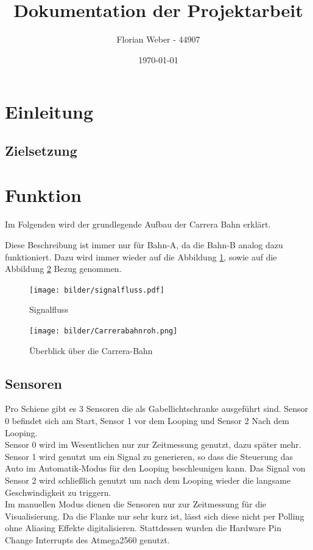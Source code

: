 \documentclass[a4paper, 11pt]{scrartcl}
\title{Dokumentation der Projektarbeit}
\author{Florian Weber - 44907}
\date{\today}
\begin{document}
\maketitle	%
\newpage

\tableofcontents 	%
\listoffigures		%
\newpage

\section{Einleitung}
\subsection{Zielsetzung}
\newpage

\section{Funktion}
	Im Folgenden wird der grundlegende Aufbau der Carrera Bahn erklärt.

	Diese Beschreibung ist immer nur für Bahn-A, da die 
	Bahn-B analog dazu funktioniert. Dazu wird immer wieder auf die Abbildung \ref{img:signalfluss}, sowie auf die \\Abbildung 
	\ref{img:carrerakomplett} Bezug genommen.
	\begin{figure}[h]
		\centering
		\texttt{[image: bilder/signalfluss.pdf]}
		\caption{Signalfluss}
		\label{img:signalfluss}
	\end{figure}
	\begin{figure}[h]
	\centering
	\texttt{[image: bilder/Carrerabahnroh.png]}
	\caption{Überblick über die Carrera-Bahn}
	\label{img:carrerakomplett}
	\end{figure}
	\newpage

	\subsection{Sensoren}
		Pro Schiene gibt es 3 Sensoren die als Gabellichtschranke ausgeführt sind. Sensor 0 befindet sich am Start, Sensor 1 vor dem Looping und 		Sensor 2 Nach dem Looping.\\

		Sensor 0 wird im Wesentlichen nur zur Zeitmessung genutzt, dazu später mehr.
		Sensor 1 wird genutzt um ein Signal zu generieren, so dass die Steuerung das Auto im Automatik-Modus für den Looping beschleunigen kann. 		Das Signal von Sensor 2 wird schließlich genutzt um nach dem Looping wieder die langsame Geschwindigkeit zu triggern.\\
		Im manuellen Modus dienen die Sensoren nur zur Zeitmessung für die Visualisierung.
		Da die Flanke nur sehr kurz ist, lässt sich diese nicht per Polling ohne Aliasing Effekte digitalisieren. Stattdessen wurden die Hardware 		Pin Change Interrupts des Atmega2560 genutzt.
\end{document}
